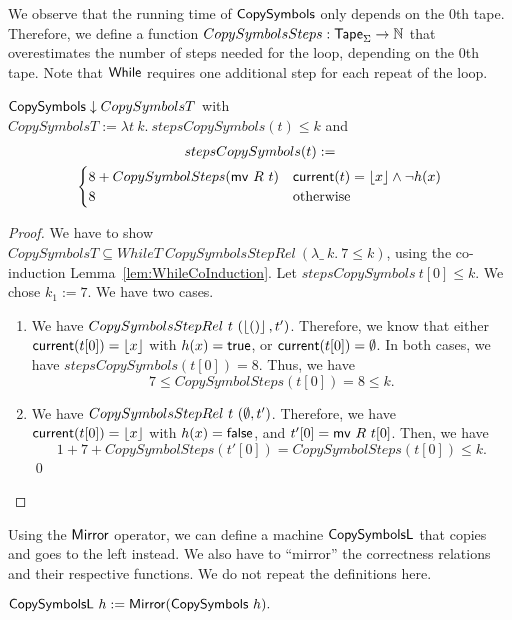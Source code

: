 We observe that the running time of $\mathsf{CopySymbols}$ only depends on the $0$th tape.  Therefore, we define a function
$CopySymbolsSteps : \mathsf{Tape}_\Sigma \rightarrow \mathbb{N}$ that overestimates the number of steps needed for the loop, depending on the $0$th tape.  Note that
$\mathsf{While}$ requires one additional step for each repeat of the loop.
\begin{lemma}
  $\mathsf{CopySymbols} \mathrel{\downarrow} CopySymbolsT$ with \\
  $CopySymbolsT := \lambda t~k.~stepsCopySymbols(t) \leq k$ and
  \begin{multline*}
    stepsCopySymbols (t) := \\
    \begin{cases}
      8 + CopySymbolSteps(\mathsf{mv}~R~t) & \mathsf{current}(t)=\left\lfloor {x} \right\rfloor \land \lnot h(x) \\
      8                                & \text{otherwise}
    \end{cases}
  \end{multline*}
\end{lemma}
\begin{proof}
  We have to show $CopySymbolsT \subseteq WhileT~CopySymbolsStepRel~(\lambda \_~k.~7 \leq k)$, using the co-induction
  Lemma~\ref{lem:WhileCoInduction}.  Let $stepsCopySymbols~t[0] \leq k$.  We chose $k_1 := 7$.  We have two cases.
  \begin{enumerate}
  \item We have $CopySymbolsStepRel~t~(\left\lfloor {\ensuremath{\mathsf{()}}} \right\rfloor, t')$.  Therefore, we know that either $\mathsf{current}(t[0])=\left\lfloor {x} \right\rfloor$ with $h(x)=\mathsf{true}$, or
    $\mathsf{current}(t[0])=\emptyset$.  In both cases, we have $stepsCopySymbols(t[0]) = 8$.  Thus, we have
    $$ 7 \leq CopySymbolSteps(t[0]) = 8 \leq k. $$
  \item We have $CopySymbolsStepRel~t~(\emptyset, t')$.  Therefore, we have $\mathsf{current}(t[0])=\left\lfloor {x} \right\rfloor$ with $h(x)=\mathsf{false}$, and $t'[0]=\mathsf{mv}~R~t[0]$.
    Then, we have
    $$ 1+7+CopySymbolSteps(t'[0]) = CopySymbolSteps(t[0]) \leq k.$$
    \qed
  \end{enumerate}
\end{proof}

Using the $\mathsf{Mirror}$ operator, we can define a machine $\MS{CopySymbolsL}$ that copies and goes to the left instead.  We also have to ``mirror''
the correctness relations and their respective functions.  We do not repeat the definitions here.
\begin{definition}[$\MS{CopySymbolsL}$][CopySymbols_L]
  $\mathsf{CopySymbolsL}~h := \mathsf{Mirror}(\mathsf{CopySymbols}~h).$
\end{definition}

